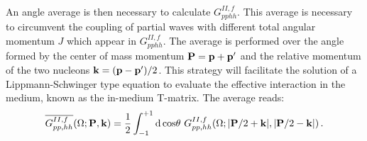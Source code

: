  An angle average is then necessary to calculate $G^{II,f}_{pphh}$. This average is necessary to circumvent the coupling of partial waves with different total angular momentum $J$ which appear in $G^{II,f}_{pphh}$. The average is performed over the angle formed by the center of mass momentum ${\bf P}={\bf p}+{\bf p'}$ and the relative momentum of the two nucleons ${\bf k}=({\bf p}-{\bf p'})/2$. This strategy will facilitate the solution of a Lippmann-Schwinger type equation to evaluate the effective interaction in the medium, known as the in-medium T-matrix. The average reads:
\begin{equation}
\overline{G^{II,f}_{pp,hh}}(\Omega;{\bf P},{\bf k})=\frac{1}{2}\int_{-1}^{+1}{\rm d\,cos}\theta~G^{II,f}_{pp,hh}(\Omega;|{\bf P}/2+{\bf k}|,|{\bf P}/2-{\bf k}|)\,.
\end{equation}

